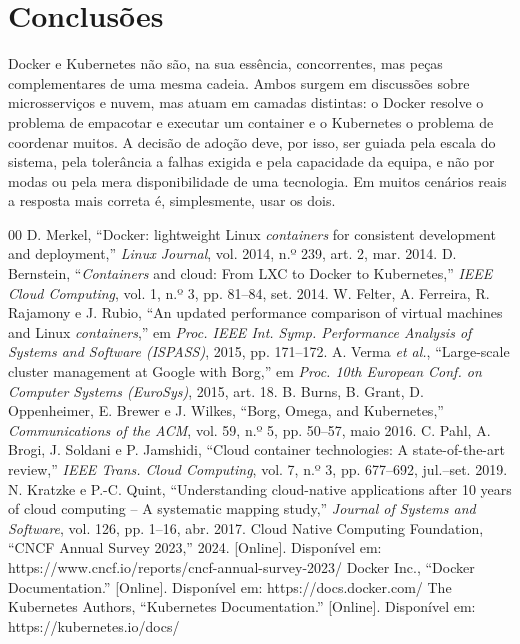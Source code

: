 \documentclass[conference]{IEEEtran}
\begin{document}
\section{Conclusões}
Docker e Kubernetes não são, na sua essência, concorrentes, mas peças complementares de uma mesma cadeia. Ambos surgem em discussões sobre microsserviços e nuvem, mas atuam em camadas distintas: o Docker resolve o problema de empacotar e executar um container e o Kubernetes o problema de coordenar muitos. A decisão de adoção deve, por isso, ser guiada pela escala do sistema, pela tolerância a falhas exigida e pela capacidade da equipa, e não por modas ou pela mera disponibilidade de uma tecnologia. Em muitos cenários reais a resposta mais correta é, simplesmente, usar os dois.
\newpage

\begin{thebibliography}{00}
 D. Merkel, ``Docker: lightweight Linux \textit{containers} for consistent development and deployment,'' \textit{Linux Journal}, vol. 2014, n.º 239, art. 2, mar. 2014.
 D. Bernstein, ``\textit{Containers} and cloud: From LXC to Docker to Kubernetes,'' \textit{IEEE Cloud Computing}, vol. 1, n.º 3, pp. 81--84, set. 2014.
 W. Felter, A. Ferreira, R. Rajamony e J. Rubio, ``An updated performance comparison of virtual machines and Linux \textit{containers},'' em \textit{Proc. IEEE Int. Symp. Performance Analysis of Systems and Software (ISPASS)}, 2015, pp. 171--172.
 A. Verma \textit{et al.}, ``Large-scale cluster management at Google with Borg,'' em \textit{Proc. 10th European Conf. on Computer Systems (EuroSys)}, 2015, art. 18.
 B. Burns, B. Grant, D. Oppenheimer, E. Brewer e J. Wilkes, ``Borg, Omega, and Kubernetes,'' \textit{Communications of the ACM}, vol. 59, n.º 5, pp. 50--57, maio 2016.
 C. Pahl, A. Brogi, J. Soldani e P. Jamshidi, ``Cloud container technologies: A state-of-the-art review,'' \textit{IEEE Trans. Cloud Computing}, vol. 7, n.º 3, pp. 677--692, jul.--set. 2019.
 N. Kratzke e P.-C. Quint, ``Understanding cloud-native applications after 10 years of cloud computing -- A systematic mapping study,'' \textit{Journal of Systems and Software}, vol. 126, pp. 1--16, abr. 2017.
 Cloud Native Computing Foundation, ``CNCF Annual Survey 2023,'' 2024. [Online]. Disponível em: https://www.cncf.io/reports/cncf-annual-survey-2023/
 Docker Inc., ``Docker Documentation.'' [Online]. Disponível em: https://docs.docker.com/
 The Kubernetes Authors, ``Kubernetes Documentation.'' [Online]. Disponível em: https://kubernetes.io/docs/
\end{thebibliography}
\end{document}
